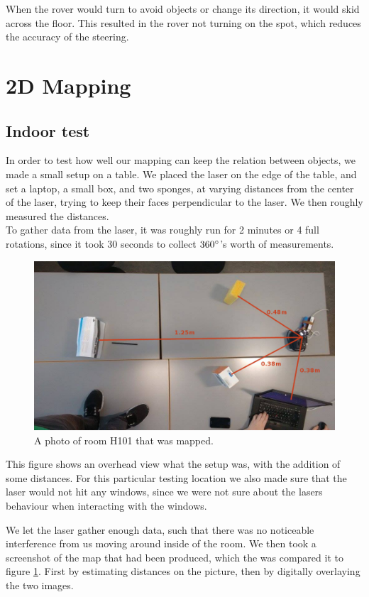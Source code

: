 When the rover would turn to avoid objects or change its direction, it would skid across the floor. This resulted in the rover not turning on the spot, which reduces the accuracy of the steering.

\clearpage
\section{2D Mapping}

\subsection{Indoor test}
In order to test how well our mapping can keep the relation between objects, we made a small setup on a table. We placed the laser on the edge of the table, and set a laptop, a small box, and two sponges, at varying distances from the center of the laser, trying to keep their faces perpendicular to the laser. We then roughly measured the distances.\\
To gather data from the laser, it was roughly run for 2 minutes or 4 full rotations,  since it took 30 seconds to collect $360\degree$'s worth of measurements.

\begin{figure}[H]
	\centering
	\includegraphics[scale=.4]{images/h101-photo.jpg}
	\caption{A photo of room H101 that was mapped.}
	\label{laser-test}
\end{figure}
	
This figure shows an overhead view what the setup was, with the addition of some distances. For this particular testing location we also made sure that the laser would not hit any windows, since we were not sure about the lasers behaviour when interacting with the windows.

We let the laser gather enough data, such that there was no noticeable interference from us moving around inside of the room. We then took a screenshot of the map that had been produced, which the was compared it to figure \ref{laser-test}. First by estimating distances on the picture, then by digitally overlaying the two images.

